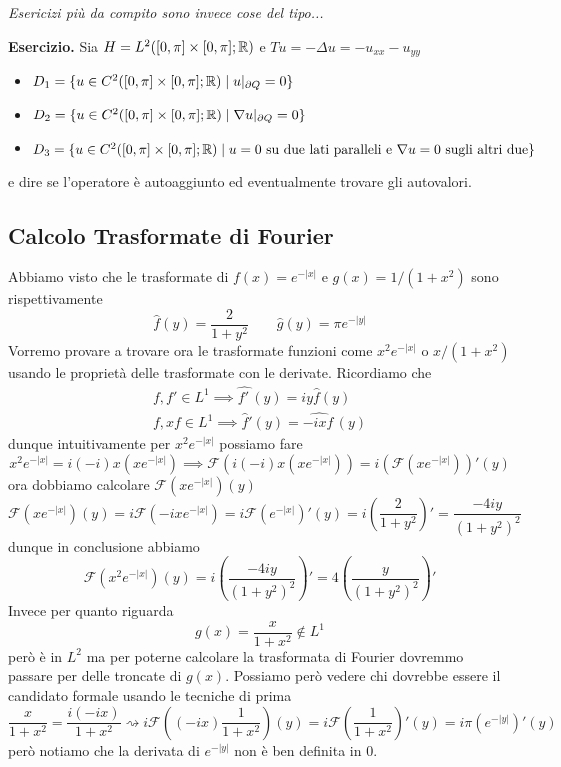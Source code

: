 \textit{Esericizi più da compito sono invece cose del tipo...}

\textbf{Esercizio.}
Sia $H = L^2([0, \pi] \times [0, \pi]; \mathbb R)$ e $T u = -\Delta u = -u_{xx} -u_{yy}$
\begin{itemize}
	\item $D_1 = \{ u \in C^2([0, \pi] \times [0, \pi]; \mathbb R) \mid u|_{\partial Q} = 0 \}$
	\item $D_2 = \{ u \in C^2([0, \pi] \times [0, \pi]; \mathbb R) \mid \nabla u|_{\partial Q} = 0 \}$
	\item $D_3 = \{ u \in C^2([0, \pi] \times [0, \pi]; \mathbb R) \mid \text{$u = 0$ su due lati paralleli e $\nabla u = 0$ sugli altri due} \}$
\end{itemize}
e dire se l'operatore è autoaggiunto ed eventualmente trovare gli autovalori.

\subsection{Calcolo Trasformate di Fourier}

Abbiamo visto che le trasformate di $f(x) = e^{-|x|}$ e $g(x) = 1 / (1 + x^2)$ sono rispettivamente
$$
\hat f(y) = \frac{2}{1 + y^2}
\qquad
\hat g(y) = \pi e^{-|y|}
$$
Vorremo provare a trovare ora le trasformate funzioni come $x^2 e^{-|x|}$ o $x / (1 + x^2)$ usando le proprietà delle trasformate con le derivate. Ricordiamo che
$$
\begin{gathered}
	f, f' \in L^1 \implies \hat{f'\,}(y) = i y \hat f(y) \\
	f, x f \in L^1 \implies \hat{f}'(y) = \hat{-i x f\,}(y)
\end{gathered}
$$
dunque intuitivamente per $x^2 e^{-|x|}$ possiamo fare
$$
x^2 e^{-|x|} = i (-i) x (x e^{-|x|}) \implies \mathcal F(i (-i) x (x e^{-|x|})) = i (\mathcal F(x e^{-|x|}))'(y)
$$
ora dobbiamo calcolare $\mathcal F(x e^{-|x|})(y)$
$$
\mathcal F(x e^{-|x|})(y) = i \mathcal F(-ix e^{-|x|}) = i \mathcal F(e^{-|x|})'(y) = i \left(\frac{2}{1 + y^2}\right)' = \frac{-4iy}{(1+y^2)^2}
$$
dunque in conclusione abbiamo
$$
\mathcal F(x^2 e^{-|x|})(y) = i \left(\frac{-4iy}{(1 + y^2)^2}\right)' = 4 \left(\frac{y}{(1 + y^2)^2}\right)'
$$
Invece per quanto riguarda
$$
g(x) = \frac{x}{1+x^2} \notin L^1
$$
però è in $L^2$ ma per poterne calcolare la trasformata di Fourier dovremmo passare per delle troncate di $g(x)$. Possiamo però vedere chi dovrebbe essere il candidato formale usando le tecniche di prima
$$
\frac{x}{1+x^2} = \frac{i (-ix)}{1+x^2} \rightsquigarrow 
i \mathcal F \left( (-ix) \frac{1}{1+x^2} \right)(y)
= i \mathcal F \left( \frac{1}{1+x^2} \right)'(y) = i \pi (e^{-|y|})'(y)
$$
però notiamo che la derivata di $e^{-|y|}$ non è ben definita in $0$.

